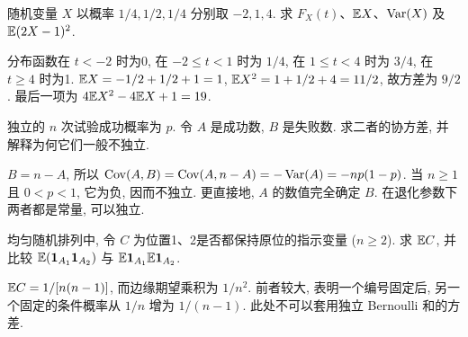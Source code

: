 \begin{exercise}
随机变量 $X$ 以概率 $1/4,1/2,1/4$ 分别取 $-2,1,4$. 求 $F_X(t)$、$\mathbb E X$、$\operatorname{Var}(X)$ 及 $\mathbb E(2X-1)^2$.
\end{exercise}
\begin{solution}
分布函数在 $t<-2$ 时为0, 在 $-2\le t<1$ 时为 $1/4$, 在 $1\le t<4$ 时为 $3/4$, 在 $t\ge4$ 时为1. $\mathbb E X=-1/2+1/2+1=1$, $\mathbb E X^2=1+1/2+4=11/2$, 故方差为 $9/2$. 最后一项为 $4\mathbb E X^2-4\mathbb E X+1=19$.
\end{solution}
\begin{exercise}
独立的 $n$ 次试验成功概率为 $p$. 令 $A$ 是成功数, $B$ 是失败数. 求二者的协方差, 并解释为何它们一般不独立.
\end{exercise}
\begin{solution}
$B=n-A$, 所以 $\operatorname{Cov}(A,B)=\operatorname{Cov}(A,n-A)=-\operatorname{Var}(A)=-np(1-p)$. 当 $n\ge1$ 且 $0<p<1$, 它为负, 因而不独立. 更直接地, $A$ 的数值完全确定 $B$. 在退化参数下两者都是常量, 可以独立.
\end{solution}
\begin{exercise}
均匀随机排列中, 令 $C$ 为位置1、2是否都保持原位的指示变量 ($n\ge2$). 求 $\mathbb E C$, 并比较 $\mathbb E(\mathbf 1_{A_1}\mathbf 1_{A_2})$ 与 $\mathbb E\mathbf 1_{A_1}\mathbb E\mathbf 1_{A_2}$.
\end{exercise}
\begin{solution}
$\mathbb E C=1/[n(n-1)]$, 而边缘期望乘积为 $1/n^2$. 前者较大, 表明一个编号固定后, 另一个固定的条件概率从 $1/n$ 增为 $1/(n-1)$. 此处不可以套用独立 Bernoulli 和的方差.
\end{solution}
